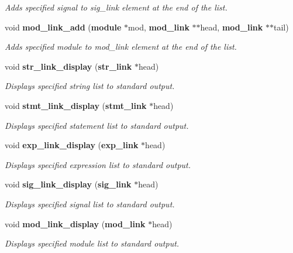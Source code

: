 \begin{CompactItemize}
\begin{CompactList}\small\item\em Adds specified signal to sig\_\-link element at the end of the list.\item\end{CompactList}\item 
void {\bf mod\_\-link\_\-add} ({\bf module} $\ast$mod, {\bf mod\_\-link} $\ast$$\ast$head, {\bf mod\_\-link} $\ast$$\ast$tail)
\begin{CompactList}\small\item\em Adds specified module to mod\_\-link element at the end of the list.\item\end{CompactList}\item 
void {\bf str\_\-link\_\-display} ({\bf str\_\-link} $\ast$head)
\begin{CompactList}\small\item\em Displays specified string list to standard output.\item\end{CompactList}\item 
void {\bf stmt\_\-link\_\-display} ({\bf stmt\_\-link} $\ast$head)
\begin{CompactList}\small\item\em Displays specified statement list to standard output.\item\end{CompactList}\item 
void {\bf exp\_\-link\_\-display} ({\bf exp\_\-link} $\ast$head)
\begin{CompactList}\small\item\em Displays specified expression list to standard output.\item\end{CompactList}\item 
void {\bf sig\_\-link\_\-display} ({\bf sig\_\-link} $\ast$head)
\begin{CompactList}\small\item\em Displays specified signal list to standard output.\item\end{CompactList}\item 
void {\bf mod\_\-link\_\-display} ({\bf mod\_\-link} $\ast$head)
\begin{CompactList}\small\item\em Displays specified module list to standard output.\item\end{CompactList}\item 

\end{CompactItemize}
